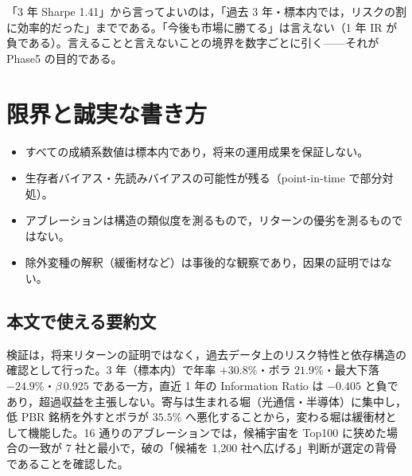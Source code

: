 \documentclass[a4paper,10pt]{article}
\begin{document}
「3 年 Sharpe 1.41」から言ってよいのは，「過去 3 年・標本内では，リスクの割に効率的だった」までである。「今後も市場に勝てる」は言えない（1 年 IR が負である）。言えることと言えないことの境界を数字ごとに引く——それが Phase5 の目的である。

\section{限界と誠実な書き方}
\label{sec:limits}

\begin{itemize}
\item すべての成績系数値は標本内であり，将来の運用成果を保証しない。
\item 生存者バイアス・先読みバイアスの可能性が残る（point-in-time で部分対処）。
\item アブレーションは構造の類似度を測るもので，リターンの優劣を測るものではない。
\item 除外変種の解釈（緩衝材など）は事後的な観察であり，因果の証明ではない。
\end{itemize}

\subsection{本文で使える要約文}
\begin{keybox}
検証は，将来リターンの証明ではなく，過去データ上のリスク特性と依存構造の確認として行った。3 年（標本内）で年率 $+30.8\%$・ボラ $21.9\%$・最大下落 $-24.9\%$・$\beta\,0.925$ である一方，直近 1 年の Information Ratio は $-0.405$ と負であり，超過収益を主張しない。寄与は生まれる堀（光通信・半導体）に集中し，低 PBR 銘柄を外すとボラが $35.5\%$ へ悪化することから，変わる堀は緩衝材として機能した。16 通りのアブレーションでは，候補宇宙を Top100 に狭めた場合の一致が 7 社と最小で，破の「候補を 1{,}200 社へ広げる」判断が選定の背骨であることを確認した。
\end{keybox}

\newpage
\end{document}
